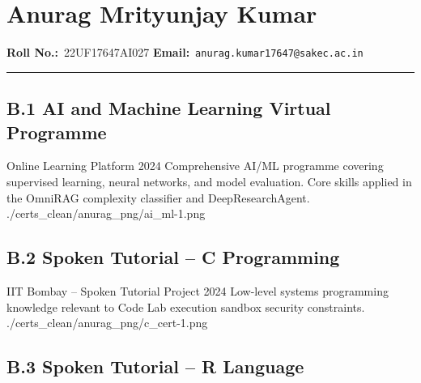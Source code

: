 

\clearpage
\section{Anurag Mrityunjay Kumar}
\label{sec:certs-anurag}

\noindent\textbf{Roll No.:}~22UF17647AI027 \qquad
\textbf{Email:}~\texttt{anurag.kumar17647@sakec.ac.in}

\vspace{0.4em}\noindent\rule{\linewidth}{0.4pt}\vspace{0.6em}

\subsection*{B.1 \quad AI and Machine Learning Virtual Programme}

\certentry
  {Online Learning Platform}
  {2024}
  {Comprehensive AI/ML programme covering supervised learning, neural networks,
   and model evaluation. Core skills applied in the OmniRAG complexity classifier
   and DeepResearchAgent.}
  {./certs_clean/anurag_png/ai_ml-1.png}

\subsection*{B.2 \quad Spoken Tutorial -- C Programming}

\certentry
  {IIT Bombay -- Spoken Tutorial Project}
  {2024}
  {Low-level systems programming knowledge relevant to Code Lab execution
   sandbox security constraints.}
  {./certs_clean/anurag_png/c_cert-1.png}

\subsection*{B.3 \quad Spoken Tutorial -- R Language}

